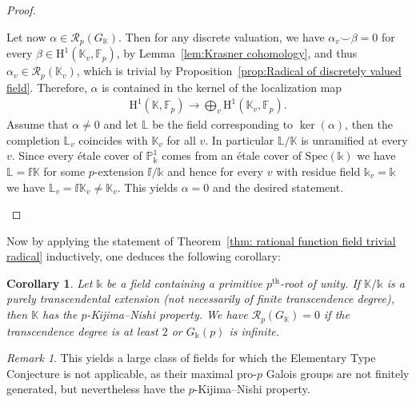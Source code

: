 \documentclass{amsart}
\newtheorem{cor}[thm]{Corollary}
\theoremstyle{definition}
\theoremstyle{remark}
\newtheorem{rem}[thm]{Remark}
\newcommand{\KK}{\mathbb{K}}
\newcommand{\LL}{\mathbb{L}}
\newcommand{\FF}{\mathbb{F}}
\newcommand{\calR}{\mathcal{R}}
\newcommand{\rmH}{\mathrm H}%
\begin{document}
\begin{proof}
\begin{itemize}[leftmargin=.5cm]
        Let now $\alpha\in \calR_p(G_{\KK})$. Then for any discrete valuation, we have $\alpha_v\!\smallsmile\!\beta=0$ for every $\beta \in \rmH^1(\KK_v,\FF_p)$, by Lemma~\ref{lem:Krasner cohomology}, and thus $\alpha_v\in \mathcal{R}_p(\KK_v)$, which is trivial by Proposition~\ref{prop:Radical of discretely valued field}. { Therefore, $\alpha$ is contained in the kernel of the localization map
        \begin{align*}
            \rmH^1(\KK,\FF_p)\to {\bigoplus}_{v}\rmH^1(\KK_v,\FF_p).
        \end{align*}
        Assume that $\alpha\neq 0$ and let $\LL$ be the field corresponding to $\ker(\alpha)$, then the completion $\LL_v$ coincides with $\KK_v$ for all $v$. In particular $\LL/\KK$ is unramified at every $v$. Since every étale cover of $\mathbb{P}^1_{\mathbb{k}}$ comes from an étale cover of $\mathrm{Spec}(\mathbb{k})$ we have $\LL=\mathbb{f}\KK$ for some $p$-extension $\mathbb{f}/\mathbb{k}$ and hence for every $v$ with residue field $\mathbb{k}_v=\mathbb{k}$ we have $\LL_v=\mathbb{f}\KK_v\neq \KK_v$. This yields $\alpha=0$ and the desired statement.
        } 
    \end{itemize}
\end{proof}

Now by applying the statement of Theorem~\ref{thm: rational function field trivial radical} inductively, one deduces the following corollary:
\begin{cor}
\label{cor: function field in n variables has trivial radical}
    Let $\mathbb{k}$ be a field containing a primitive $p^{\mathrm{th}}$-root of unity. If $\KK/\mathbb{k}$ is a purely transcendental extension (not necessarily of finite transcendence degree), then $\KK$ has the $p$-Kijima--Nishi property. We have $\calR_p(G_{\KK})=0$ if the transcendence degree is at least $2$ or $G_{\mathbb{k}}(p)$ is infinite.
\end{cor}
\begin{rem}
    This yields a large class of fields for which the Elementary Type Conjecture is not applicable, as their maximal pro-$p$ Galois groups are not finitely generated, but nevertheless have the $p$-Kijima--Nishi property.
\end{rem}
\end{document}

